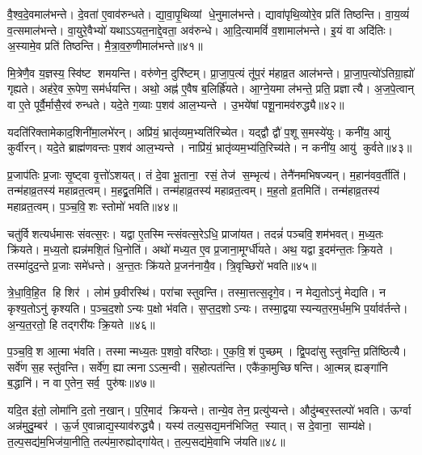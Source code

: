 वै॒श्व॒दे॒वमाल॑भन्ते।
दे॒वता॑ ए॒वाव॑रुन्धते।
द्या॒वा॒पृ॒थिव्यां धे॒नुमाल॑भन्ते।
द्यावा॑पृथि॒व्योरे॒व प्रति॑ तिष्ठन्ति।
वा॒य॒व्यं॑ व॒त्समाल॑भन्ते।
वा॒युरे॒वैभ्यो॑ यथाऽऽयत॒नाद्दे॒वता॒ अव॑रुन्धे।
आ॒दि॒त्यामविं॑ व॒शामाल॑भन्ते।
इ॒यं वा अदि॑तिः।
अ॒स्यामे॒व प्रति॑ तिष्ठन्ति।
मै॒त्रा॒व॒रु॒णीमाल॑भन्ते॥४१॥

मि॒त्रेणै॒व य॒ज्ञस्य॒ स्वि॑ष्ट शमयन्ति।
वरु॑णेन॒ दुरि॑ष्टम्।
प्रा॒जा॒प॒त्यं तू॑प॒रं म॑हाव्र॒त आल॑भन्ते।
प्रा॒जा॒प॒त्यो॑ऽतिग्रा॒ह्यो॑ गृह्यते।
अह॑रे॒व रू॒पेण॒ सम॑र्धयन्ति।
अथो॒ अह्न॑ ए॒वैष ब॒लिर्ह्रि॑यते।
आ॒ग्ने॒यमा ल॑भन्ते॒ प्रति॒ प्रज्ञात्यै।
अ॒ज॒पे॒त्वान् वा ए॒ते पूर्वै॒र्मासै॒रव॑ रुन्धते।
यदे॒ते ग॒व्याः प॒शव॑ आल॒भ्यन्ते।
उ॒भये॑षां पशू॒नामव॑रुद्ध्यै॥४२॥

यदति॑रिक्तामेकाद॒शिनी॑मा॒लभे॑रन्।
अप्रि॑यं॒ भ्रातृ॑व्यम॒भ्यति॑\-रिच्येत।
यद्द्वौ द्वौ॑ प॒शू स॒मस्ये॑युः।
कनी॑य॒ आयु॑ कुर्वीरन्।
यदे॒ते ब्राह्म॑णवन्तः प॒शव॑ आल॒भ्यन्ते।
नाप्रि॑यं॒ भ्रातृ॑व्यम॒भ्य॑ति॒रिच्य॑ते।
न कनी॑य॒ आयु॑ कुर्वते॥४३॥\anuvakamend[ते ए॒वाल॑भन्ते मैत्रावरु॒णीमाल॑भ॒न्तेऽव॑रुद्ध्यै स॒प्त च॑]

प्र॒जाप॑तिः प्र॒जाः सृ॒ष्ट्वा वृ॒त्तो॑ऽशयत्।
तं दे॒वा भू॒ताना॒ रसं॒ तेज॑ स॒म्भृत्य॑।
तेनै॑नमभिषज्यन्।
म॒हान॑वव॒र्तीति॑।
तन्म॑हाव्र॒तस्य॑ महाव्रत॒त्वम्।
म॒हद्व्र॒तमिति॑।
तन्म॑हाव्र॒तस्य॑ महाव्रत॒त्वम्।
म॒ह॒तो व्र॒तमिति॑।
तन्म॑हाव्र॒तस्य॑ महाव्रत॒त्वम्।
प॒ञ्च॒वि॒शः स्तोमो॑ भवति॥४४॥

चतु॑र्विशत्यर्धमासः संवत्स॒रः।
यद्वा ए॒तस्मिन्त्संवत्स॒रेऽधि॒ प्राजा॑यत।
तदन्नं॑ पञ्चवि॒शम॑भवत्।
म॒ध्य॒तः क्रि॑यते।
म॒ध्य॒तो ह्यन्न॑मशि॒तं धि॒नोति॑।
अथो॑ मध्य॒त ए॒व प्र॒जाना॒मूर्ग्धी॑यते।
अथ॒ यद्वा इ॒दम॑न्त॒तः क्रि॒यते।
तस्मा॑दुद॒न्ते प्र॒जाः समे॑धन्ते।
अ॒न्त॒तः क्रि॑यते प्र॒जन॑नायै॒व।
त्रि॒वृच्छिरो॑ भवति॥४५॥

त्रे॒धा॒वि॒हि॒त हि शिर॑।
लोम॑ छ॒वीरस्थि॑।
परा॑चा स्तुवन्ति।
तस्मा॒त्तत्स॒दृगे॒व।
न मेद्य॒तोऽनु॑ मेद्यति।
न कृश्य॒तोऽनु॑ कृश्यति।
प॒ञ्च॒द॒शोऽन्यः प॒क्षो भ॑वति।
स॒प्त॒द॒शोऽन्यः।
तस्मा॒द्वयास्यन्यत॒रम॒र्धम॒भि प॒र्याव॑र्तन्ते।
अ॒न्य॒त॒रतो॒ हि तद्गरी॑यः क्रि॒यते॥४६॥

प॒ञ्च॒वि॒श आ॒त्मा भ॑वति।
तस्मान्मध्य॒तः प॒शवो॒ वरि॑ष्ठाः।
ए॒क॒वि॒शं पुच्छम्।
द्वि॒पदा॑सु स्तुवन्ति॒ प्रति॑ष्ठित्यै।
सर्वे॑ण स॒ह स्तु॑वन्ति।
सर्वे॑ण॒ ह्यात्मनाऽऽत्म॒न्वी।
स॒होत्पत॑न्ति।
एकै॑का॒मुच्छिषन्ति।
आ॒त्मन्न् ह्यङ्गा॑नि ब॒द्धानि॑।
न वा ए॒तेन॒ सर्व॒ पुरु॑षः॥४७॥

यदि॒त इ॑तो॒ लोमा॑नि द॒तो न॒खान्।
प॒रि॒माद॑ क्रियन्ते।
तान्ये॒व तेन॒ प्रत्यु॑प्यन्ते।
औदु॑म्बर॒स्तल्पो॑ भवति।
ऊर्ग्वा अन्न॑मुदु॒म्बर॑।
ऊ॒र्ज ए॒वान्नाद्य॒स्याव॑रुद्ध्यै।
यस्य॑ तल्प॒सद्य॒मन॑भिजित॒ स्यात्।
स दे॒वाना॒ साम्य॑क्षे।
त॒ल्प॒सद्य॑म॒भिज॑या॒नीति॒ तल्प॑मा॒रुह्योद्गा॑येत्।
त॒ल्प॒सद्य॑मे॒वाभि ज॑यति॥४८॥

